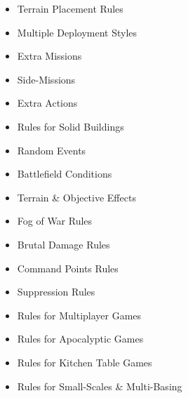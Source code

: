 \documentclass[9pt, a4paper, bookmarks=false]{extarticle}            %
\begin{document}
\begin{multicols}{2}
\begin{itemize}
  \item Terrain Placement Rules
  \item Multiple Deployment Styles
  \item Extra Missions
  \item Side-Missions
  \item Extra Actions
  \item Rules for Solid Buildings
  \item Random Events
  \item Battlefield Conditions
  \item Terrain \& Objective Effects
  \item Fog of War Rules
  \item Brutal Damage Rules
  \item Command Points Rules
  \item Suppression Rules
  \item Rules for Multiplayer Games
  \item Rules for Apocalyptic Games
  \item Rules for Kitchen Table Games
  \item Rules for Small-Scales \& Multi-Basing
\end{itemize}

\vfill\null

\end{multicols}



\newpage



\section{}

\begin{multicols}{2}



\vfill\null

\columnbreak



\end{multicols}
\end{document}
